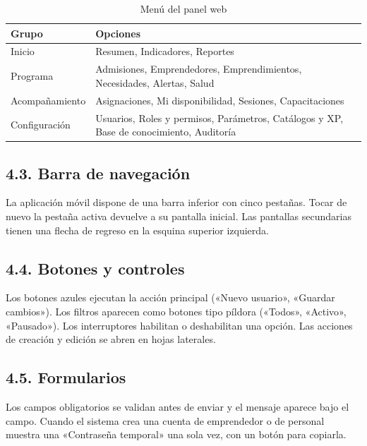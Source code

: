 \documentclass[12pt,letterpaper]{article}
\begin{document}
\begin{table}[H]\singlespacing\small
\caption{Menú del panel web}
\begin{tabularx}{\textwidth}{XX}
\toprule
\textbf{Grupo} & \textbf{Opciones} \\
\midrule
\relax Inicio & Resumen, Indicadores, Reportes \\
\relax Programa & Admisiones, Emprendedores, Emprendimientos, Necesidades, Alertas, Salud \\
\relax Acompañamiento & Asignaciones, Mi disponibilidad, Sesiones, Capacitaciones \\
\relax Configuración & Usuarios, Roles y permisos, Parámetros, Catálogos y XP, Base de conocimiento, Auditoría \\
\bottomrule
\end{tabularx}
\end{table}

\subsection*{4.3. Barra de navegación}


La aplicación móvil dispone de una barra inferior con cinco pestañas. Tocar de nuevo la pestaña activa devuelve a su pantalla inicial. Las pantallas secundarias tienen una flecha de regreso en la esquina superior izquierda.

\subsection*{4.4. Botones y controles}


Los botones azules ejecutan la acción principal («Nuevo usuario», «Guardar cambios»). Los filtros aparecen como botones tipo píldora («Todos», «Activo», «Pausado»). Los interruptores habilitan o deshabilitan una opción. Las acciones de creación y edición se abren en hojas laterales.

\subsection*{4.5. Formularios}


Los campos obligatorios se validan antes de enviar y el mensaje aparece bajo el campo. Cuando el sistema crea una cuenta de emprendedor o de personal muestra una «Contraseña temporal» una sola vez, con un botón para copiarla.
\end{document}
